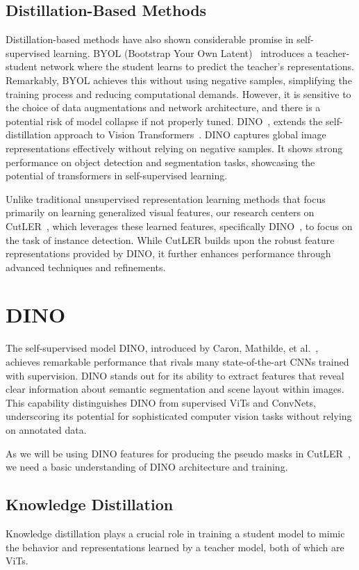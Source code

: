 \subsection{Distillation-Based Methods}
Distillation-based methods have also shown considerable promise in self-supervised learning. BYOL (Bootstrap Your Own Latent)~\cite{grill2020bootstrap} introduces a teacher-student network where the student learns to predict the teacher's representations. Remarkably, BYOL achieves this without using negative samples, simplifying the training process and reducing computational demands. However, it is sensitive to the choice of data augmentations and network architecture, and there is a potential risk of model collapse if not properly tuned. DINO~\cite{caron2021emerging}, extends the self-distillation approach to Vision Transformers~\cite{dosovitskiy2020image}. DINO captures global image representations effectively without relying on negative samples. It shows strong performance on object detection and segmentation tasks, showcasing the potential of transformers in self-supervised learning.

Unlike traditional unsupervised representation learning methods that focus primarily on learning generalized visual features, our research centers on CutLER~\cite{wang2023cut}, which leverages these learned features, specifically DINO~\cite{caron2021emerging}, to focus on the task of instance detection. While CutLER builds upon the robust feature representations provided by DINO, it further enhances performance through advanced techniques and refinements.

\section{DINO}
The self-supervised model DINO, introduced by Caron, Mathilde, et al.~\cite{caron2021emerging}, achieves remarkable performance that rivals many state-of-the-art CNNs trained with supervision. DINO stands out for its ability to extract features that reveal clear information about semantic segmentation and scene layout within images. This capability distinguishes DINO from supervised ViTs and ConvNets, underscoring its potential for sophisticated computer vision tasks without relying on annotated data.

As we will be using DINO features for producing the pseudo masks in CutLER~\cite{wang2023cut}, we need a basic understanding of DINO architecture and training.

\subsection{Knowledge Distillation}
 Knowledge distillation plays a crucial role in training a student model to mimic the behavior and representations learned by a teacher model, both of which are ViTs. 
 
